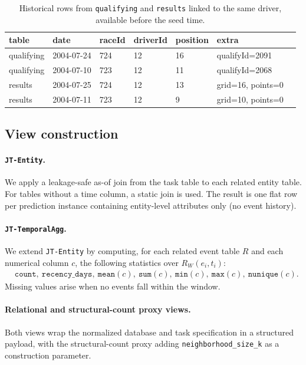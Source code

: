 \documentclass[11pt]{article}
\newcommand{\viewname}[1]{\texttt{#1}}
\begin{document}
\begin{table}[h]
\centering
\small
\caption{Historical rows from \texttt{qualifying} and \texttt{results}
linked to the same driver, available before the seed time.}
\label{tab:relbench-history-example}
\begin{tabular}{lllllll}
\toprule
table & date & raceId & driverId & position & extra \\
\midrule
qualifying & 2004-07-24 & 724 & 12 & 16 & qualifyId=2091 \\
qualifying & 2004-07-10 & 723 & 12 & 11 & qualifyId=2068 \\
results    & 2004-07-25 & 724 & 12 & 13 & grid=16, points=0 \\
results    & 2004-07-11 & 723 & 12 & 9  & grid=10, points=0 \\
\bottomrule
\end{tabular}
\end{table}

\subsection{View construction}

\paragraph{\viewname{JT-Entity}.}
We apply a leakage-safe as-of join from the task table to each
related entity table.
For tables without a time column, a static join is used.
The result is one flat row per prediction instance containing
entity-level attributes only (no event history).

\paragraph{\viewname{JT-TemporalAgg}.}
We extend \viewname{JT-Entity} by computing, for each related event
table $R$ and each numerical column $c$, the following statistics
over $R_W(e_i, t_i)$:
\begin{align*}
  &\texttt{count},\ \texttt{recency\_days},\ \texttt{mean}(c),\
   \texttt{sum}(c),\ \texttt{min}(c),\ \texttt{max}(c),\ \texttt{nunique}(c).
\end{align*}
Missing values arise when no events fall within the window.

\paragraph{Relational and structural-count proxy views.}
Both views wrap the normalized database and task specification in a
structured payload, with the structural-count proxy adding
\texttt{neighborhood\_size\_k} as a construction parameter.
\end{document}
